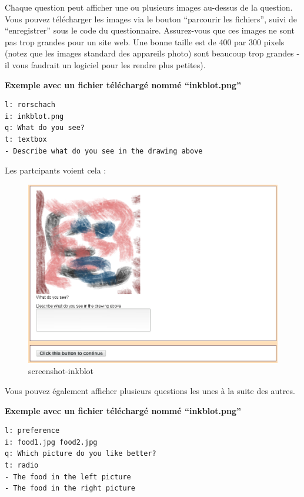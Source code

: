 \documentclass[
]{book}
\begin{document}
Chaque question peut afficher une ou plusieurs images au-dessus de la question. Vous pouvez télécharger les images via le bouton ``parcourir les fichiers'', suivi de ``enregistrer'' sous le code du questionnaire. Assurez-vous que ces images ne sont pas trop grandes pour un site web. Une bonne taille est de 400 par 300 pixels (notez que les images standard des appareils photo) sont beaucoup trop grandes - il vous faudrait un logiciel pour les rendre plus petites).

\textbf{Exemple avec un fichier téléchargé nommé ``inkblot.png''}

\begin{verbatim}
l: rorschach
i: inkblot.png
q: What do you see?
t: textbox
- Describe what do you see in the drawing above
\end{verbatim}

Les partcipants voient cela :

\begin{figure}
\centering
\includegraphics{img/screenshot-inkblot.png}
\caption{screenshot-inkblot}
\end{figure}

Vous pouvez également afficher plusieurs questions les unes à la suite des autres.

\textbf{Exemple avec un fichier téléchargé nommé ``inkblot.png''}

\begin{verbatim}
l: preference
i: food1.jpg food2.jpg
q: Which picture do you like better?
t: radio
- The food in the left picture
- The food in the right picture
\end{verbatim}
\end{document}
